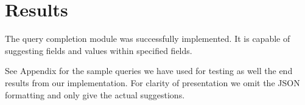 \section{Results}\label{results}

The query completion module was successfully implemented. It is capable of suggesting fields and values within specified fields. 

See Appendix for the sample queries we have used for testing as well the end results from our implementation. For clarity of presentation we omit the JSON formatting and only give the actual suggestions.\\






